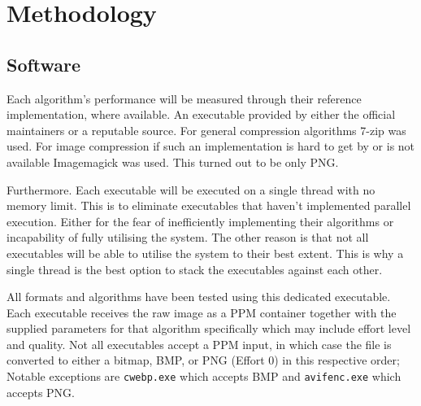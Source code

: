 \documentclass[11pt,a4paper]{report}
\begin{document}


\section{Methodology}

\subsection{Software}

Each algorithm's performance will be measured through their reference implementation, where available. An executable provided by either the official maintainers or a reputable source. For general compression algorithms 7-zip was used. For image compression if such an implementation is hard to get by or is not available Imagemagick \cite{imagemagick} was used. This turned out to be only PNG.

Furthermore. Each executable will be executed on a single thread with no memory limit. This is to eliminate executables that haven't implemented parallel execution. Either for the fear of inefficiently implementing their algorithms or incapability of fully utilising the system. The other reason is that not all executables will be able to utilise the system to their best extent. This is why a single thread is the best option to stack the executables against each other. 

All formats and algorithms have been tested using this dedicated executable. Each executable receives the raw image as a PPM container together with the supplied parameters for that algorithm specifically which may include effort level and quality. Not all executables accept a PPM input, in which case the file is converted to either a bitmap, BMP, or PNG (Effort 0) in this respective order; Notable exceptions are \verb|cwebp.exe| which accepts BMP and \verb|avifenc.exe| which accepts PNG.
\end{document}
